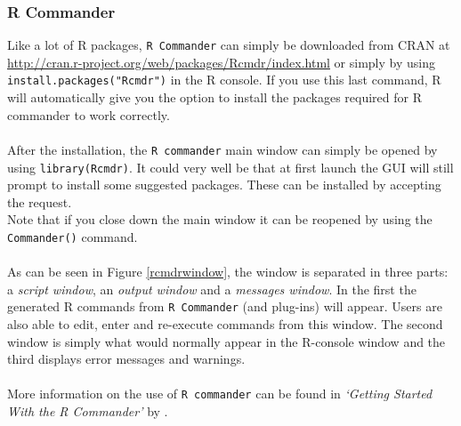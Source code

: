 \documentclass[a4paper]{article}\usepackage[]{graphicx}\usepackage[]{color}
\begin{document}
\subsubsection{R Commander}
\noindent Like a lot of R packages, \verb|R Commander| can simply be downloaded
from CRAN at \url{http://cran.r-project.org/web/packages/Rcmdr/index.html} or
simply by using \verb|install.packages("Rcmdr")| in the R console. If you use
this last command, R will automatically give you the option to install the
packages required for R commander to work correctly. \\ \\
After the installation, the \verb|R commander| main window can simply be opened
by using \verb|library(Rcmdr)|. It could very well be that at first launch the
GUI will still prompt to install some suggested packages. These can be
installed by accepting the request.\\
Note that if you close down the main window it can be reopened by using the
\verb|Commander()| command. 
\\ \\
As can be seen in Figure \ref{rcmdrwindow}, the window is separated in three
parts: a {\it script window}, an {\it output window} and a {\it messages
window}.
In the first the generated R commands from \verb|R Commander| (and plug-ins)
will appear. Users are also able to edit, enter and re-execute commands from
this window. The second window is simply what would normally appear in the
R-console window and the third displays error messages and warnings.
\\ \\
More information on the use of \verb|R commander| can be found in {\it `Getting
Started With the R Commander'} by \citet{Fox2007}.
\end{document}
